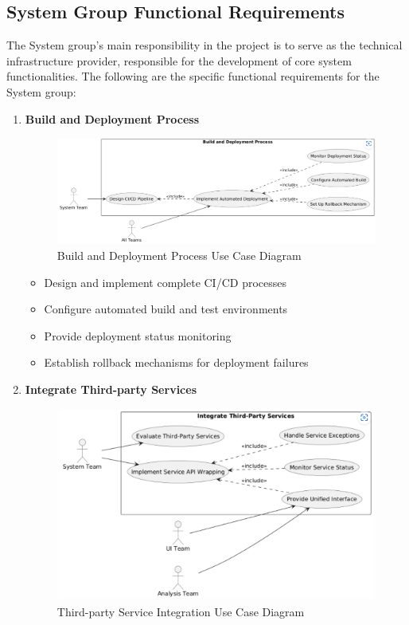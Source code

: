 \documentclass[a4paper,12pt]{article}
\begin{document}
\subsection{System Group Functional Requirements}

The System group's main responsibility in the project is to serve as the technical infrastructure provider, responsible for the development of core system functionalities. The following are the specific functional requirements for the System group:

\begin{enumerate}
  \item \textbf{Build and Deployment Process}
  
  \begin{figure}[H]
    \centering
    \includegraphics[width=0.9\linewidth]{assets/image1_EG.png}
    \caption{Build and Deployment Process Use Case Diagram}
    \label{fig:deployment-process}
  \end{figure}
  
  \begin{itemize}
    \item Design and implement complete CI/CD processes
    \item Configure automated build and test environments
    \item Provide deployment status monitoring
    \item Establish rollback mechanisms for deployment failures
  \end{itemize}
  
  \item \textbf{Integrate Third-party Services}
  
  \begin{figure}[H]
    \centering
    \includegraphics[width=0.75\linewidth]{assets/image11_EG.png}
    \caption{Third-party Service Integration Use Case Diagram}
    \label{fig:third-party-services}
  \end{figure}
  

\end{enumerate}
\end{document}
